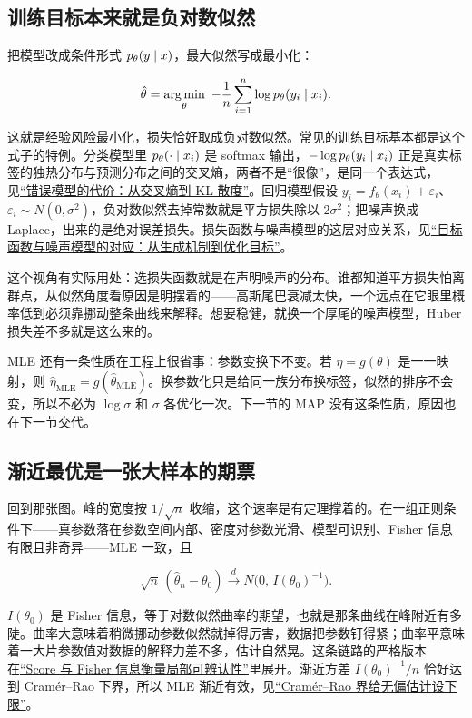 \subsection{训练目标本来就是负对数似然}

把模型改成条件形式 \(p_\theta(y\mid x)\)，最大似然写成最小化：

\[
\hat\theta=\argmin_\theta\ -\frac1n\sum_{i=1}^n\log p_\theta(y_i\given x_i).
\]

这就是经验风险最小化，损失恰好取成负对数似然。常见的训练目标基本都是这个式子的特例。分类模型里 \(p_\theta(\cdot\mid x_i)\) 是 softmax 输出，\(-\log p_\theta(y_i\mid x_i)\) 正是真实标签的独热分布与预测分布之间的交叉熵，两者不是``很像''，是同一个表达式，见\hyperref[sec:07-Information-Theory/03-Divergences/01]{``错误模型的代价：从交叉熵到 KL 散度''}。回归模型假设 \(y_i=f_\theta(x_i)+\varepsilon_i\)、\(\varepsilon_i\sim N(0,\sigma^2)\)，负对数似然去掉常数就是平方损失除以 \(2\sigma^2\)；把噪声换成 Laplace，出来的是绝对误差损失。损失函数与噪声模型的这层对应关系，见\hyperref[sec:13-Machine-Learning/01-Learning-Problems-and-Evaluation/03]{``目标函数与噪声模型的对应：从生成机制到优化目标''}。

这个视角有实际用处：选损失函数就是在声明噪声的分布。谁都知道平方损失怕离群点，从似然角度看原因是明摆着的——高斯尾巴衰减太快，一个远点在它眼里概率低到必须靠挪动整条曲线来解释。想要稳健，就换一个厚尾的噪声模型，Huber 损失差不多就是这么来的。

MLE 还有一条性质在工程上很省事：参数变换下不变。若 \(\eta=g(\theta)\) 是一一映射，则 \(\hat\eta_{\mathrm{MLE}}=g(\hat\theta_{\mathrm{MLE}})\)。换参数化只是给同一族分布换标签，似然的排序不会变，所以不必为 \(\log\sigma\) 和 \(\sigma\) 各优化一次。下一节的 MAP 没有这条性质，原因也在下一节交代。

\subsection{渐近最优是一张大样本的期票}

回到那张图。峰的宽度按 \(1/\sqrt{n}\) 收缩，这个速率是有定理撑着的。在一组正则条件下——真参数落在参数空间内部、密度对参数光滑、模型可识别、Fisher 信息有限且非奇异——MLE 一致，且

\[
\sqrt n\,(\hat\theta_n-\theta_0)\overset{d}{\longrightarrow}N\bigl(0,\,I(\theta_0)^{-1}\bigr).
\]

\(I(\theta_0)\) 是 Fisher 信息，等于对数似然曲率的期望，也就是那条曲线在峰附近有多陡。曲率大意味着稍微挪动参数似然就掉得厉害，数据把参数钉得紧；曲率平意味着一大片参数值对数据的解释力差不多，估计自然晃。这条链路的严格版本在\hyperref[sec:11-Mathematical-Statistics/03-Sufficient-Statistics-and-Information/02]{``Score 与 Fisher 信息衡量局部可辨认性''}里展开。渐近方差 \(I(\theta_0)^{-1}/n\) 恰好达到 Cramér--Rao 下界，所以 MLE 渐近有效，见\hyperref[sec:11-Mathematical-Statistics/03-Sufficient-Statistics-and-Information/03]{``Cramér--Rao 界给无偏估计设下限''}。

